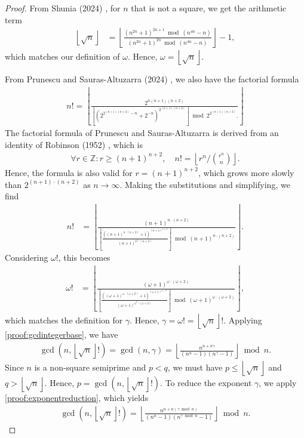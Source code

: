 \documentclass{article}
\theoremstyle{plain}
\theoremstyle{definition}
\newcommand{\floor}[1]{\left\lfloor #1 \right\rfloor}
\newcommand{\Z}{\mathbb{Z}}
\begin{document}
\begin{proof}
From Shunia (2024) \cite{shunia2024polynomial}, for $n$ that is not a square, we get the arithmetic term
\begin{align*}
\floor{\sqrt{n}} &=
\floor{\frac{(n^{2n} + 1)^{2n+1} \bmod (n^{4n}-n)}{(n^{2n} + 1)^{2n} \bmod (n^{4n}-n)}} - 1 ,
\end{align*}
which matches our definition of $\omega$. Hence, $\omega = \floor{\sqrt{n}}$.

From Prunescu and Sauras-Altuzarra (2024) \cite{prunescu2024factorial}, we also have the factorial formula
\begin{align*}
n! = \floor
{
    \frac
    {
        2^{n(n+1)(n+2)}
    }
    {
        \floor
        {
            \left(
                2^{2^{(n+1)(n+2)}-n} + 2^{-n}
            \right)^{2^{(n+1)(n+2)}}
        }
        \bmod
        2^{2^{(n+1)(n+2)}} .
    }
}
\end{align*}
The factorial formula of Prunescu and Sauras-Altuzarra is derived from an identity of Robinson (1952) \cite{robinson1952arithmetic}, which is
\begin{align*}
    \forall r \in \Z : r \geq (n+1)^{n+2},
    \quad
    n! = \floor{r^n / \binom{r^n}{n}} .
\end{align*}
Hence, the formula is also valid for $r=(n+1)^{n+2}$, which grows more slowly than $2^{(n+1)\cdot(n+2)}$ as $n\rightarrow\infty$. Making the substitutions and simplifying, we find
\begin{align*}
n! &= \floor
{
    \frac
    {
        (n+1)^{n\cdot(n+2)}
    }
    {
        \floor
        {
            \frac
            {
            \left( (n+1)^{n\cdot(n+2)} + 1 \right)^{(n+1)^{n+2}}
            }
            {
            (n+1)^{n^2\cdot(n+2)}
            }
        }
        \bmod (n+1)^{n\cdot(n+2)}
    }
} .
\end{align*}
Considering $\omega!$, this becomes
\begin{align*}
\omega! &= \floor
{
    \frac
    {
        (\omega+1)^{\omega\cdot(\omega+2)}
    }
    {
        \floor
        {
            \frac
            {
            \left( (\omega+1)^{\omega\cdot(\omega+2)} + 1 \right)^{(\omega+1)^{\omega+2}}
            }
            {
            (\omega+1)^{\omega^2\cdot(\omega+2)}
            }
        }
        \bmod (\omega+1)^{\omega\cdot(\omega+2)}
    }
} ,
\end{align*}
which matches the definition for $\gamma$. Hence, $\gamma = \omega! = \floor{\sqrt{n}}!$. Applying \cref{proof:gcdintegerbase}, we have
\begin{align*}
    \gcd(n, \floor{\sqrt{n}}!) = \gcd(n,\gamma) = \floor{\frac{n^{n+n\gamma}}{(n^n-1)(n^{\gamma}-1)}}\bmod n .
\end{align*}
Since $n$ is a non-square semiprime and $p < q$, we must have $p \leq \floor{\sqrt{n}}$ and $q > \floor{\sqrt{n}}$. Hence, $p = \gcd(n,\floor{\sqrt{n}}!)$. To reduce the exponent $\gamma$, we apply \cref{proof:exponentreduction}, which yields
\begin{align*}
    \gcd(n, \floor{\sqrt{n}}!) = \floor{\frac{n^{n+n(\gamma \bmod n)}}{(n^n-1)(n^{\gamma \bmod n}-1)}}\bmod n .
\end{align*}
\end{proof}
\end{document}
